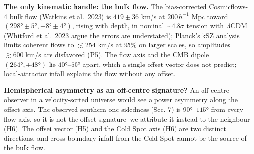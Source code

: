 \documentclass[
]{article}
\begin{document}
\textbf{The only kinematic handle: the bulk flow.} The bias-corrected
Cosmicflows-4 bulk flow (Watkins et al.~2023) is \(419 \pm 36\) km/s at
\(200\,h^{-1}\) Mpc toward \((298° \pm 5°, -8° \pm 4°)\), rising with
depth, in nominal \(\sim\!4.8\sigma\) tension with \(\Lambda\)CDM
(Whitford et al.~2023 argue the errors are understated); Planck's kSZ
analysis limits coherent flows to \(\lesssim 254\) km/s at \(95\%\) on
larger scales, so amplitudes \(\gtrsim 600\) km/s are disfavored (P5).
The flow axis and the CMB dipole \((264°, +48°)\) lie \(40°\)--\(50°\)
apart, which a single offset vector does not predict; local-attractor
infall explains the flow without any offset.

\textbf{Hemispherical asymmetry as an off-centre signature?} An
off-centre observer in a velocity-sorted universe would see a power
asymmetry along the offset axis. The observed southern one-sidedness
(Sec. 7) is \(90°\)--\(115°\) from every flow axis, so it is not the
offset signature; we attribute it instead to the neighbour (H6). The
offset vector (H5) and the Cold Spot axis (H6) are two distinct
directions, and cross-boundary infall from the Cold Spot cannot be the
source of the bulk flow.
\end{document}
